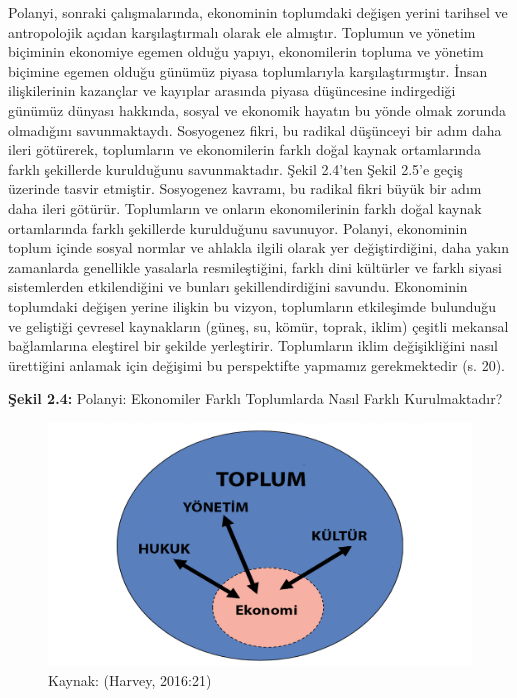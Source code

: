 \documentclass[
]{book}
\begin{document}
Polanyi, sonraki çalışmalarında, ekonominin toplumdaki değişen yerini tarihsel ve antropolojik açıdan karşılaştırmalı olarak ele almıştır. Toplumun ve yönetim biçiminin ekonomiye egemen olduğu yapıyı, ekonomilerin topluma ve yönetim biçimine egemen olduğu günümüz piyasa toplumlarıyla karşılaştırmıştır. İnsan ilişkilerinin kazançlar ve kayıplar arasında piyasa düşüncesine indirgediği günümüz dünyası hakkında, sosyal ve ekonomik hayatın bu yönde olmak zorunda olmadığını savunmaktaydı. Sosyogenez fikri, bu radikal düşünceyi bir adım daha ileri götürerek, toplumların ve ekonomilerin farklı doğal kaynak ortamlarında farklı şekillerde kurulduğunu savunmaktadır. Şekil 2.4'ten Şekil 2.5'e geçiş üzerinde tasvir etmiştir. Sosyogenez kavramı, bu radikal fikri büyük bir adım daha ileri götürür. Toplumların ve onların ekonomilerinin farklı doğal kaynak ortamlarında farklı şekillerde kurulduğunu savunuyor. Polanyi, ekonominin toplum içinde sosyal normlar ve ahlakla ilgili olarak yer değiştirdiğini, daha yakın zamanlarda genellikle yasalarla resmileştiğini, farklı dini kültürler ve farklı siyasi sistemlerden etkilendiğini ve bunları şekillendirdiğini savundu. Ekonominin toplumdaki değişen yerine ilişkin bu vizyon, toplumların etkileşimde bulunduğu ve geliştiği çevresel kaynakların (güneş, su, kömür, toprak, iklim) çeşitli mekansal bağlamlarına eleştirel bir şekilde yerleştirir. Toplumların iklim değişikliğini nasıl ürettiğini anlamak için değişimi bu perspektifte yapmamız gerekmektedir (s. 20). \citep{harvey2016climate}

\textbf{Şekil 2.4:} Polanyi: Ekonomiler Farklı Toplumlarda Nasıl Farklı Kurulmaktadır?

\begin{figure}
\includegraphics[width=0.95\linewidth,height=0.95\textheight]{tablolar-sekiller/sekil-2-4} \caption{Kaynak: (Harvey, 2016:21)}\label{fig:unnamed-chunk-5}
\end{figure}
\end{document}
